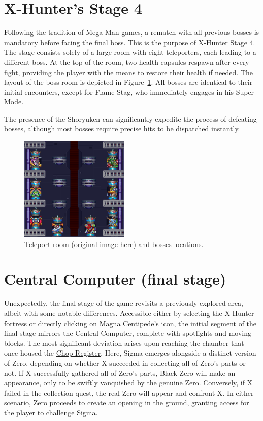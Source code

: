 \section{X-Hunter's Stage 4}
Following the tradition of Mega Man games, a rematch with all previous bosses is mandatory before facing the final boss. This is the purpose of X-Hunter Stage 4. The stage consists solely of a large room with eight teleporters, each leading to a different boss. At the top of the room, two health capsules respawn after every fight, providing the player with the means to restore their health if needed. The layout of the boss room is depicted in Figure~\ref{fig:teleport_room}. All bosses are identical to their initial encounters, except for Flame Stag, who immediately engages in his Super Mode.

The presence of the Shoryuken can significantly expedite the process of defeating bosses, although most bosses require precise hits to be dispatched instantly.

\begin{figure}[htp]
	\centering
	\includegraphics[height=5cm]{figures/X2/Hunter_stages/map-4.png}
	\caption[Teleport room and boss location]{Teleport room (original image \href{https://vgmaps.com/Atlas/SuperNES/MegaManX2-X-HunterBase-Stage4.png}{here}) and bosses locations.}
	\label{fig:teleport_room}
\end{figure}

\section{Central Computer (final stage)}

Unexpectedly, the final stage of the game revisits a previously explored area, albeit with some notable differences. Accessible either by selecting the X-Hunter fortress or directly clicking on Magna Centipede's icon, the initial segment of the final stage mirrors the Central Computer, complete with spotlights and moving blocks. The most significant deviation arises upon reaching the chamber that once housed the \hyperlink{miniboss:Chop_Register}{Chop Register}. Here, Sigma emerges alongside a distinct version of Zero, depending on whether X succeeded in collecting all of Zero's parts or not. If X successfully gathered all of Zero's parts, Black Zero will make an appearance, only to be swiftly vanquished by the genuine Zero. Conversely, if X failed in the collection quest, the real Zero will appear and confront X. In either scenario, Zero proceeds to create an opening in the ground, granting access for the player to challenge Sigma. 

